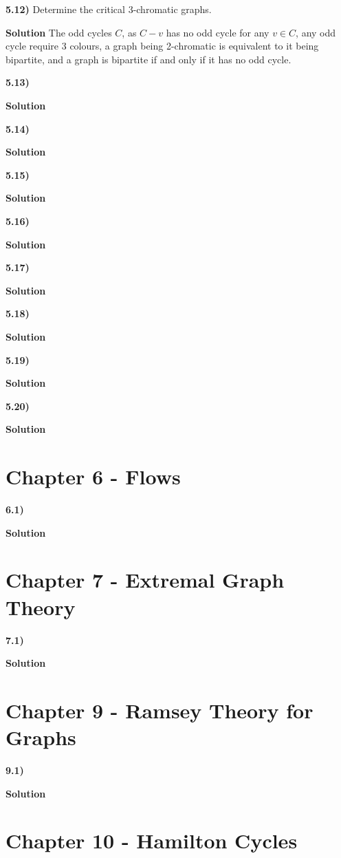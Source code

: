 \documentclass[11pt]{article}
\theoremstyle{plain}
\begin{document}
\textbf{5.12)} Determine the critical 3-chromatic graphs.

\noindent \textbf{Solution} The odd cycles $C$, as $C-v$ has no odd cycle for any $v \in C$, any odd cycle require 3 colours, a graph being 2-chromatic is equivalent to it being bipartite, and a graph is bipartite if and only if it has no odd cycle.

\textbf{5.13)} 

\noindent \textbf{Solution} 

\textbf{5.14)} 

\noindent \textbf{Solution} 

\textbf{5.15)} 

\noindent \textbf{Solution} 

\textbf{5.16)} 

\noindent \textbf{Solution} 

\textbf{5.17)} 

\noindent \textbf{Solution} 

\textbf{5.18)} 

\noindent \textbf{Solution} 

\textbf{5.19)} 

\noindent \textbf{Solution} 

\textbf{5.20)} 

\noindent \textbf{Solution} 

\section{Chapter 6 - Flows}

\textbf{6.1)} 


\noindent \textbf{Solution} 

\section{Chapter 7 - Extremal Graph Theory}

\textbf{7.1)} 


\noindent \textbf{Solution} 

\section{Chapter 9 - Ramsey Theory for Graphs}

\textbf{9.1)} 


\noindent \textbf{Solution} 

\section{Chapter 10 - Hamilton Cycles}
\end{document}
